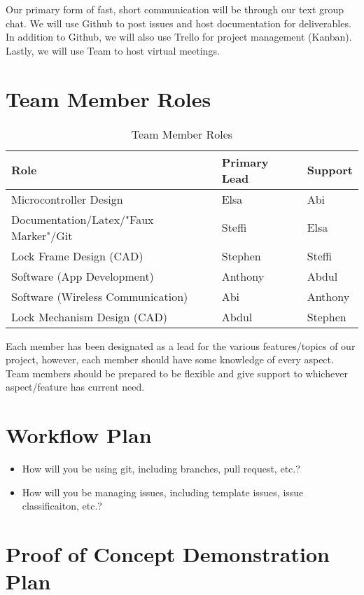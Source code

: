 \documentclass{article}
\begin{document}
Our primary form of fast, short communication will be through our text group chat. We will use Github to post issues and host documentation for deliverables.  In addition to Github, we will also use Trello for project management (Kanban).  Lastly, we will use Team to host virtual meetings.

\section{Team Member Roles}

\begin{table}[hp]
\caption{Team Member Roles} \label{TblTeamMemberRoles}
\begin{tabularx}{\textwidth}{llX}
\toprule
\textbf{Role} & \textbf{Primary Lead} & \textbf{Support}\\
\midrule
Microcontroller Design & Elsa & Abi\\
Documentation/Latex/"Faux Marker"/Git & Steffi & Elsa\\
Lock Frame Design (CAD) & Stephen & Steffi\\
Software (App Development) & Anthony & Abdul\\
Software (Wireless Communication) & Abi & Anthony\\
Lock Mechanism Design (CAD) & Abdul & Stephen\\
\bottomrule
\end{tabularx}
\end{table}

Each member has been designated as a lead for the various features/topics of our project, however, each member should have some knowledge of every aspect.  Team members should be prepared to be flexible and give support to whichever aspect/feature has current need. 

\section{Workflow Plan}

\begin{itemize}
	\item How will you be using git, including branches, pull request, etc.?
	\item How will you be managing issues, including template issues, issue
	classificaiton, etc.?
\end{itemize}

\section{Proof of Concept Demonstration Plan}
\end{document}
